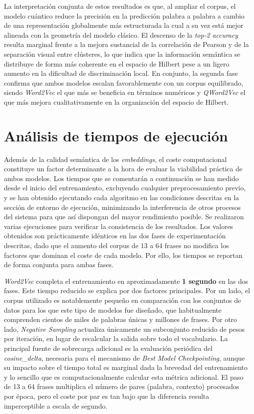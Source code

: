 La interpretación conjunta de estos resultados es que, al ampliar el corpus, el modelo cuántico reduce la precisión en la predicción palabra a palabra a cambio de una representación globalmente más estructurada la cual a su vez está mejor alineada con la geometría del modelo clásico. El descenso de la \textit{top-2 accuracy} resulta marginal frente a la mejora sustancial de la correlación de Pearson y de la separación visual entre clústeres, lo que indica que la información semántica se distribuye de forma más coherente en el espacio de Hilbert pese a un ligero aumento en la dificultad de discriminación local. En conjunto, la segunda fase confirma que ambos modelos escalan favorablemente con un corpus equilibrado, siendo \textit{Word2Vec} el que más se beneficia en términos numéricos y \textit{QWord2Vec} el que más mejora cualitativamente en la organización del espacio de Hilbert.


\section{Análisis de tiempos de ejecución}

Además de la calidad semántica de los \textit{embeddings}, el coste computacional constituye un factor determinante a la hora de evaluar la viabilidad práctica de ambos modelos. Los tiempos que se comentarán a continuación se han medido desde el inicio del entrenamiento, excluyendo cualquier preprocesamiento previo, y se han obtenido ejecutando cada algoritmo en las condiciones descritas en la sección de entorno de ejecución, minimizando la interferencia de otros procesos del sistema para que así dispongan del mayor rendimiento posible. Se realizaron varias ejecuciones para verificar la consistencia de los resultados. Los valores obtenidos son prácticamente idénticos en las dos fases de experimentación descritas, dado que el aumento del corpus de 13 a 64 frases no modifica los factores que dominan el coste de cada modelo. Por ello, los tiempos se reportan de forma conjunta para ambas fases.

\textit{Word2Vec} completa el entrenamiento en aproximadamente \textbf{1 segundo} en las dos fases. Este tiempo reducido se explica por dos factores principales. Por un lado, el corpus utilizado es notablemente pequeño en comparación con los conjuntos de datos para los que este tipo de modelos fue diseñado, que habitualmente comprenden cientos de miles de palabras únicas y millones de frases. Por otro lado, \textit{Negative Sampling} actualiza únicamente un subconjunto reducido de pesos por iteración, en lugar de recalcular la salida sobre todo el vocabulario. La principal fuente de sobrecarga adicional es la evaluación periódica del \textit{cosine\_delta}, necesaria para el mecanismo de \textit{Best Model Checkpointing}, aunque su impacto sobre el tiempo total es marginal dada la brevedad del entrenamiento y lo sencillo que es computacionalmente calcular esta métrica adicional. El paso de 13 a 64 frases multiplica el número de pares (palabra, contexto) procesados por época, pero el coste por par es tan bajo que la diferencia resulta imperceptible a escala de segundo.

